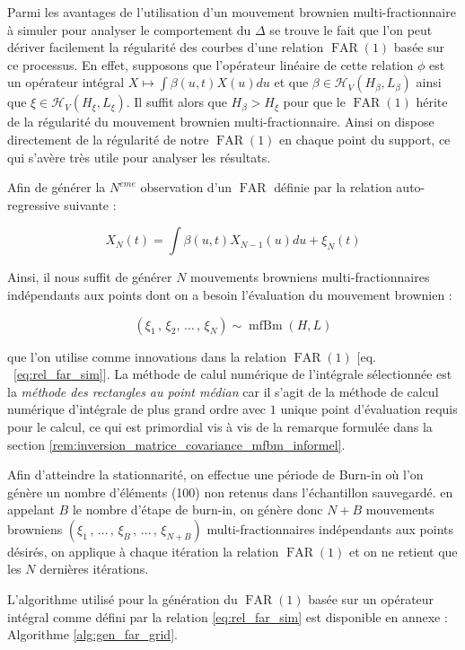 
Parmi les avantages de l'utilisation d'un mouvement brownien multi-fractionnaire à simuler pour analyser le comportement du $\Delta$ se trouve le fait que l'on peut dériver facilement la régularité des courbes d'une relation $\operatorname{FAR}(1)$ basée sur ce processus. En effet, supposons que l'opérateur linéaire de cette relation $\phi$ est un opérateur intégral $X \mapsto \int \beta(u,t) X(u)du$ et que $\beta \in \mathcal H_V(H_\beta, L_\beta)$ ainsi que $\xi \in \mathcal H_V(H_\xi, L_\xi)$. Il suffit alors que $H_\beta > H_\xi$ pour que le $\operatorname{FAR}(1)$ hérite de la régularité du mouvement brownien multi-fractionnaire. Ainsi on dispose directement de la régularité de notre $\operatorname{FAR}(1)$ en chaque point du support, ce qui s'avère très utile pour analyser les résultats.

\bigskip

\noindent Afin de générer la $N^{eme}$ observation d'un $\operatorname{FAR}$ définie par la relation auto-regressive suivante :

\begin{equation}
	X_N(t) = \int \beta(u,t)X_{N-1}(u)du + \xi_N(t) \label{eq:rel_far_sim}
\end{equation}

Ainsi, il nous suffit de générer $N$ mouvements browniens multi-fractionnaires indépendants aux points dont on a besoin l'évaluation du mouvement brownien :

\begin{equation*}
	(\xi_1 \,,\, \xi_2,\, \dots \,,\, \xi_N ) \sim \operatorname{mfBm}(H, L)
\end{equation*}



\noindent que l'on utilise comme innovations dans la relation $\operatorname{FAR}(1)$ $\bigl[$eq. ~\ref{eq:rel_far_sim}$\bigr]$. La méthode de calul numérique de l'intégrale sélectionnée est la \emph{méthode des rectangles au point médian} car il s'agit de la méthode de calcul numérique d'intégrale de plus grand ordre avec $1$ unique point d'évaluation requis pour le calcul, ce qui est primordial vis à vis de la remarque formulée dans la section \ref{rem:inversion_matrice_covariance_mfbm_informel}.

\bigskip

Afin d'atteindre la stationnarité, on effectue une période de \og Burn-in \fg où l'on génère un nombre d'éléments (100) non retenus dans l'échantillon sauvegardé. en appelant $B$ le nombre d'étape de burn-in, on génère donc $N+B$ mouvements browniens $(\xi_1 \,,\, \dots \,,\,\xi_B\,,\, \dots \,, \,\xi_{N+B} )$ multi-fractionnaires indépendants aux points désirés, on applique à chaque itération la relation $\operatorname{FAR}(1)$ et on ne retient que les $N$ dernières itérations.

\bigskip

\noindent L'algorithme utilisé pour la génération du $\operatorname{FAR}(1)$ basée sur un opérateur intégral comme défini par la relation \ref{eq:rel_far_sim} est disponible en annexe : Algorithme \ref{alg:gen_far_grid}.
